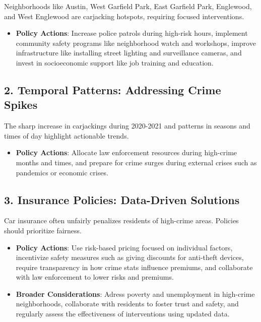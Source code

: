 \documentclass[
  9pt,
  letterpaper,
  DIV=11,
  numbers=noendperiod]{scrartcl}
\providecommand{\tightlist}{%
  \setlength{\itemsep}{0pt}\setlength{\parskip}{0pt}}\usepackage{longtable,booktabs,array}
\begin{document}
Neighborhoods like Austin, West Garfield Park, East Garfield Park,
Englewood, and West Englewood are carjacking hotspots, requiring focused
interventions.

\begin{itemize}
\tightlist
\item
  \textbf{Policy Actions}: Increase police patrols during high-risk
  hours, implement community safety programs like neighborhood watch and
  workshops, improve infrastructure like installing street lighting and
  surveillance cameras, and invest in socioeconomic support like job
  training and education.
\end{itemize}

\subsection{2. Temporal Patterns: Addressing Crime
Spikes}\label{temporal-patterns-addressing-crime-spikes}

The sharp increase in carjackings during 2020-2021 and patterns in
seasons and times of day highlight actionable trends.

\begin{itemize}
\tightlist
\item
  \textbf{Policy Actions}: Allocate law enforcement resources during
  high-crime months and times, and prepare for crime surges during
  external crises such as pandemics or economic crises.
\end{itemize}

\subsection{3. Insurance Policies: Data-Driven
Solutions}\label{insurance-policies-data-driven-solutions}

Car insurance often unfairly penalizes residents of high-crime areas.
Policies should prioritize fairness.

\begin{itemize}
\item
  \textbf{Policy Actions}: Use risk-based pricing focused on individual
  factors, incentivize safety measures such as giving discounts for
  anti-theft devices, require transparency in how crime stats influence
  premiums, and collaborate with law enforcement to lower risks and
  premiums.
\item
  \textbf{Broader Considerations}: Adress poverty and unemployment in
  high-crime neighborhoods, collaborate with residents to foster trust
  and safety, and regularly assess the effectiveness of interventions
  using updated data.
\end{itemize}
\end{document}
